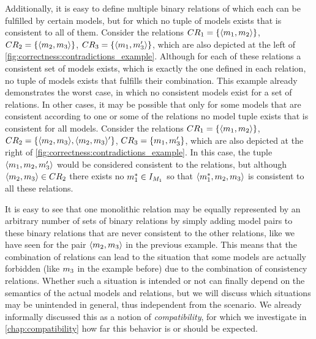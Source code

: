 Additionally, it is easy to define multiple binary relations of which each can be fulfilled by certain models, but for which no tuple of models exists that is consistent to all of them. Consider the relations $CR_{1} = \{ \langle m_{1}, m_{2} \rangle \}$, $CR_{2} = \{ \langle m_{2}, m_{3} \rangle \}$, $CR_{3} = \{ \langle m_{1}, m_{3}' \rangle \}$, which are also depicted at the left of \autoref{fig:correctness:contradictions_example}.
Although for each of these relations a consistent set of models exists, which is exactly the one defined in each relation, no tuple of models exists that fulfills their combination.
This example already demonstrates the worst case, in which no consistent models exist for a set of relations.
In other cases, it may be possible that only for some models that are consistent according to one or some of the relations no model tuple exists that is consistent for all models.
Consider the relations $CR_{1} = \{ \langle m_{1}, m_{2} \rangle \}$, $CR_{2} = \{ \langle m_{2}, m_{3} \rangle, \langle m_{2}, m_{3} \rangle' \}$, $CR_{3} = \{ m_{1}, m_{3}' \}$, which are also depicted at the right of \autoref{fig:correctness:contradictions_example}.
In this case, the tuple $\langle m_{1}, m_{2}, m_{3}' \rangle$ would be considered consistent to the relations, but although $\langle m_{2}, m_{3} \rangle \in CR_{2}$ there exists no $m^*_{1} \in I_{M_{1}}$ so that $\langle m^*_{1}, m_{2}, m_{3} \rangle$ is consistent to all these relations.

It is easy to see that one monolithic relation may be equally represented by an arbitrary number of sets of binary relations by simply adding model pairs to these binary relations that are never consistent to the other relations, like we have seen for the pair $\langle m_{2}, m_{3} \rangle$ in the previous example.
This means that the combination of relations can lead to the situation that some models are actually forbidden (like $m_{3}$ in the example before) due to the combination of consistency relations.
Whether such a situation is intended or not can finally depend on the semantics of the actual models and relations, but we will discuss which situations may be unintended in general, thus independent from the scenario.
We already informally discussed this as a notion of \emph{compatibility}, for which we investigate in \autoref{chap:compatibility} how far this behavior is or should be expected.


